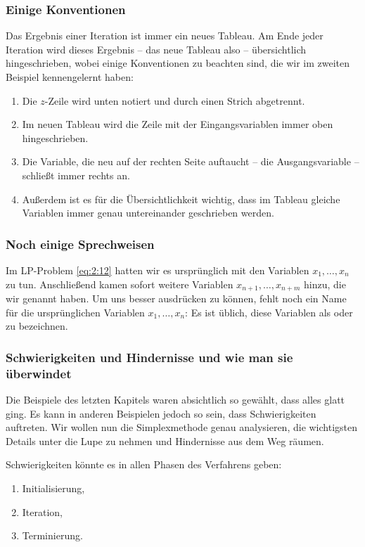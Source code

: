 \documentclass[smaller]{beamer}
\begin{document}
\begin{frame}
 \frametitle{Einige Konventionen}
 Das Ergebnis einer Iteration ist immer ein neues Tableau. Am Ende jeder Iteration wird dieses Ergebnis -- das neue Tableau also -- übersichtlich hingeschrieben, wobei einige \alert{Konventionen} zu beachten sind, die wir im zweiten Beispiel kennengelernt haben:
\begin{enumerate}
\item Die $z$-Zeile wird \alert{unten} notiert und durch einen Strich abgetrennt.
\item Im neuen Tableau wird die Zeile mit der Eingangsvariablen immer \alert{oben} hingeschrieben.
\item Die Variable, die neu auf der rechten Seite auftaucht -- die Ausgangsvariable -- schließt immer \alert{rechts} an.
\item Außerdem ist es für die Übersichtlichkeit wichtig, dass im Tableau gleiche Variablen immer \alert{genau untereinander} geschrieben werden.
\end{enumerate}
\end{frame}

\begin{frame}
 \frametitle{Noch einige Sprechweisen}
 Im LP-Problem \eqref{eq:2:12} hatten wir es ursprünglich mit den Variablen $x_1,\ldots,x_n$ zu tun. Anschließend kamen sofort weitere Variablen $x_{n+1}, \ldots, x_{n+m}$ hinzu, die wir  genannt haben. Um uns besser ausdrücken zu können, fehlt noch ein Name für die ursprünglichen Variablen $x_1,\ldots,x_n$: Es ist üblich, diese Variablen als  oder  zu bezeichnen.
\end{frame}


\begin{frame}
\frametitle{Schwierigkeiten und Hindernisse und wie man sie überwindet}
\alert{Die Beispiele des letzten Kapitels waren absichtlich so gewählt, dass alles glatt ging.} Es kann in anderen Beispielen jedoch so sein, dass Schwierigkeiten auftreten. Wir wollen nun die Simplexmethode genau analysieren, die wichtigsten Details unter die Lupe zu nehmen und Hindernisse aus dem Weg räumen.

Schwierigkeiten könnte es in allen Phasen des Verfahrens geben:
\begin{enumerate}[1)]
\item Initialisierung,
\item Iteration,
\item Terminierung. 
\end{enumerate}
\end{frame}
\end{document}

